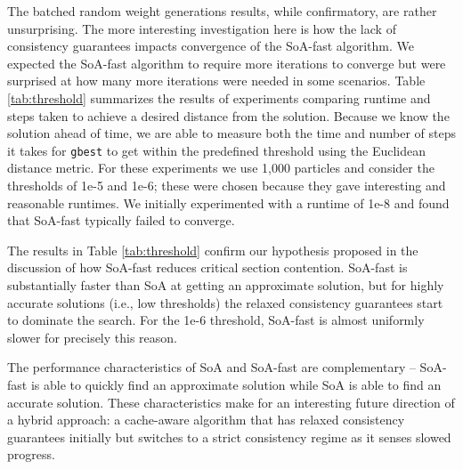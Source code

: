 The batched random weight generations results, while confirmatory, are rather
unsurprising. The more interesting investigation here is how the lack of
consistency guarantees impacts convergence of the SoA-fast algorithm. We
expected the SoA-fast algorithm to require more iterations to converge
but were surprised at how many more iterations were needed in some
scenarios. Table \ref{tab:threshold} summarizes the results of experiments
comparing runtime and steps taken to achieve a desired distance from the
solution. Because we know the solution ahead of time, we are able to measure
both the time and number of steps it
takes for \texttt{gbest} to get within the predefined threshold using the
Euclidean distance metric. For these experiments we use 1,000 particles and
consider the thresholds of 1e-5 and 1e-6; these were chosen because they
gave interesting and reasonable runtimes. We initially experimented with a
runtime of 1e-8 and found that SoA-fast typically failed to converge.

The results in Table \ref{tab:threshold} confirm our hypothesis proposed in the
discussion of how SoA-fast reduces critical section contention. SoA-fast is
substantially faster than SoA at getting an approximate solution, but for highly
accurate solutions (i.e., low thresholds) the relaxed consistency guarantees
start to dominate the search. For the 1e-6 threshold, SoA-fast is almost
uniformly slower for precisely this reason.

The performance characteristics of SoA and SoA-fast are complementary --
SoA-fast is able to quickly find an approximate solution while SoA is able to
find an accurate solution. These characteristics make for an interesting future
direction of a hybrid approach: a cache-aware algorithm that has relaxed
consistency guarantees initially but switches to a strict consistency regime as
it senses slowed progress.




